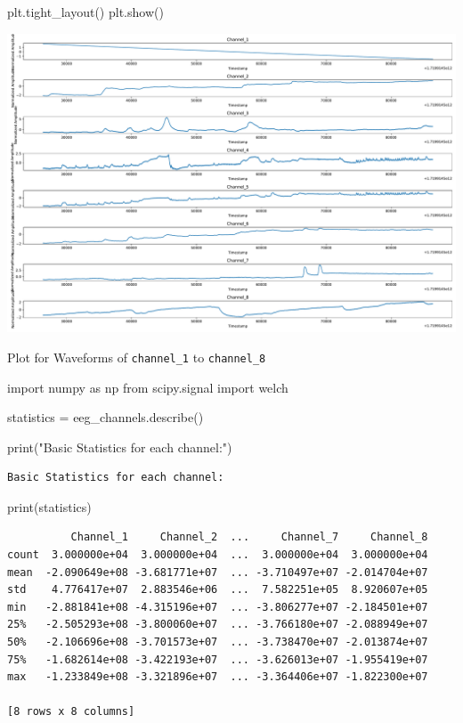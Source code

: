 \documentclass[
  11pt,
  letterpaper,
  DIV=11,
  numbers=noendperiod]{scrreprt}
\newenvironment{Shaded}{\begin{snugshade}}{\end{snugshade}}
\newcommand{\BuiltInTok}[1]{\textcolor[rgb]{0.00,0.23,0.31}{#1}}
\newcommand{\ImportTok}[1]{\textcolor[rgb]{0.00,0.46,0.62}{#1}}
\newcommand{\NormalTok}[1]{\textcolor[rgb]{0.00,0.23,0.31}{#1}}
\newcommand{\OperatorTok}[1]{\textcolor[rgb]{0.37,0.37,0.37}{#1}}
\newcommand{\StringTok}[1]{\textcolor[rgb]{0.13,0.47,0.30}{#1}}
\begin{document}
\begin{Shaded}
\begin{Highlighting}[]
\NormalTok{plt.tight\_layout()}
\NormalTok{plt.show()}
\end{Highlighting}
\end{Shaded}

\includegraphics{eeg_files/figure-pdf/unnamed-chunk-2-1.pdf}

Plot for Waveforms of \texttt{channel\_1} to \texttt{channel\_8}

\begin{Shaded}
\begin{Highlighting}[]
\ImportTok{import}\NormalTok{ numpy }\ImportTok{as}\NormalTok{ np}
\ImportTok{from}\NormalTok{ scipy.signal }\ImportTok{import}\NormalTok{ welch}

\NormalTok{statistics }\OperatorTok{=}\NormalTok{ eeg\_channels.describe()}

\BuiltInTok{print}\NormalTok{(}\StringTok{"Basic Statistics for each channel:"}\NormalTok{)}
\end{Highlighting}
\end{Shaded}

\begin{verbatim}
Basic Statistics for each channel:
\end{verbatim}

\begin{Shaded}
\begin{Highlighting}[]
\BuiltInTok{print}\NormalTok{(statistics)}
\end{Highlighting}
\end{Shaded}

\begin{verbatim}
          Channel_1     Channel_2  ...     Channel_7     Channel_8
count  3.000000e+04  3.000000e+04  ...  3.000000e+04  3.000000e+04
mean  -2.090649e+08 -3.681771e+07  ... -3.710497e+07 -2.014704e+07
std    4.776417e+07  2.883546e+06  ...  7.582251e+05  8.920607e+05
min   -2.881841e+08 -4.315196e+07  ... -3.806277e+07 -2.184501e+07
25%   -2.505293e+08 -3.800060e+07  ... -3.766180e+07 -2.088949e+07
50%   -2.106696e+08 -3.701573e+07  ... -3.738470e+07 -2.013874e+07
75%   -1.682614e+08 -3.422193e+07  ... -3.626013e+07 -1.955419e+07
max   -1.233849e+08 -3.321896e+07  ... -3.364406e+07 -1.822300e+07

[8 rows x 8 columns]
\end{verbatim}
\end{document}
